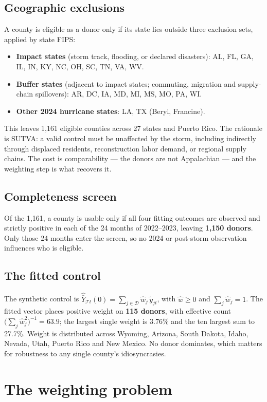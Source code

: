 \documentclass[11pt,a4paper]{article}
\newcommand{\Tr}{\mathcal{T}}
\newcommand{\Dn}{\mathcal{D}}
\begin{document}
\subsection{Geographic exclusions}
A county is eligible as a donor only if its state lies outside three exclusion sets, applied by state
FIPS:
\begin{itemize}[nosep,leftmargin=1.4em]
\item \textbf{Impact states} (storm track, flooding, or declared disasters): AL, FL, GA, IL, IN, KY, NC, OH, SC, TN, VA, WV.
\item \textbf{Buffer states} (adjacent to impact states; commuting, migration and supply-chain spillovers): AR, DC, IA, MD, MI, MS, MO, PA, WI.
\item \textbf{Other 2024 hurricane states}: LA, TX (Beryl, Francine).
\end{itemize}
This leaves 1{,}161 eligible counties across 27 states and Puerto Rico. The rationale is SUTVA: a valid
control must be unaffected by the storm, including indirectly through displaced residents,
reconstruction labor demand, or regional supply chains. The cost is comparability --- the donors are
not Appalachian --- and the weighting step is what recovers it.

\subsection{Completeness screen}
Of the 1{,}161, a county is usable only if all four fitting outcomes are observed and strictly positive
in each of the 24 months of 2022--2023, leaving \textbf{1{,}150 donors}. Only those 24 months enter the
screen, so no 2024 or post-storm observation influences who is eligible.

\subsection{The fitted control}
The synthetic control is $\widehat{\bar Y}_{\Tr t}(0)=\sum_{j\in\Dn}\widehat w_j\,\tilde y_{jt}$, with
$\widehat w\ge0$ and $\sum_j\widehat w_j=1$. The fitted vector places positive weight on
\textbf{115 donors}, with effective count $\big(\sum_j\widehat w_j^2\big)^{-1}=63.9$; the largest single
weight is 3.76\% and the ten largest sum to 27.7\%. Weight is distributed across Wyoming, Arizona,
South Dakota, Idaho, Nevada, Utah, Puerto Rico and New Mexico. No donor dominates, which matters for
robustness to any single county's idiosyncrasies.

\section{The weighting problem}\label{sec:weights}
\end{document}
